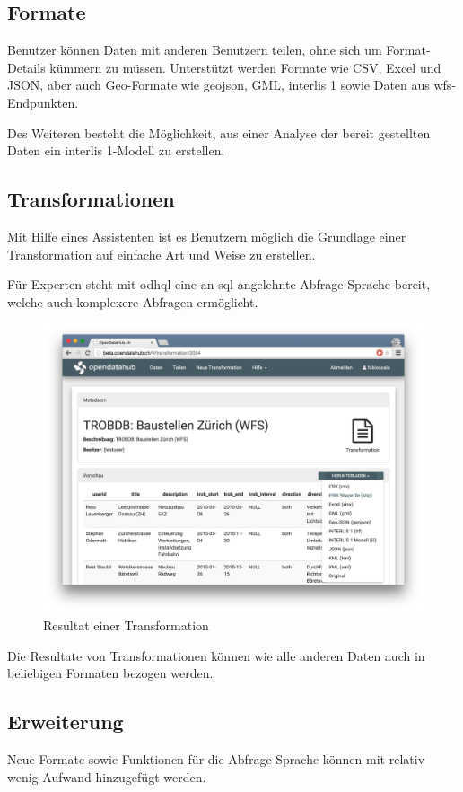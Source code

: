 \subsection*{Formate}
Benutzer können Daten mit anderen Benutzern teilen, ohne sich um Format-Details kümmern zu müssen. Unterstützt werden Formate wie CSV, Excel und JSON, aber auch Geo-Formate wie \gls{geojson}, GML, \gls{interlis} 1 sowie Daten aus \gls{wfs}-Endpunkten.

Des Weiteren besteht die Möglichkeit, aus einer Analyse der bereit gestellten Daten ein \gls{interlis} 1-Modell zu erstellen.

\subsection*{Transformationen}
Mit Hilfe eines Assistenten ist es Benutzern möglich die Grundlage einer Transformation auf einfache Art und Weise zu erstellen. 

Für Experten steht mit \gls{odhql} eine an \acs{sql} angelehnte Abfrage-Sprache bereit, welche auch komplexere Abfragen ermöglicht.

\begin{figure}[H]
    \centering
    \includegraphics[width=0.8\linewidth]{fig/transformation-detail}
    \vspace{-0.5cm}\caption*{Resultat einer Transformation}
\end{figure}

Die Resultate von Transformationen können wie alle anderen Daten auch in beliebigen Formaten bezogen werden.

\subsection*{Erweiterung}
Neue Formate sowie Funktionen für die Abfrage-Sprache können mit relativ wenig Aufwand hinzugefügt werden.

